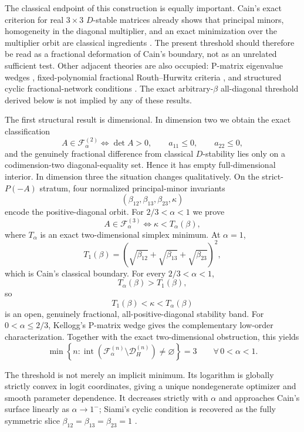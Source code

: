 The classical endpoint of this construction is equally important. Cain's exact criterion for real \(3\times3\) \(D\)-stable matrices already shows that principal minors, homogeneity in the diagonal multiplier, and an exact minimization over the multiplier orbit are classical ingredients \cite{Cain1976}. The present threshold should therefore be read as a fractional deformation of Cain's boundary, not as an unrelated sufficient test. Other adjacent theories are also occupied: P-matrix eigenvalue wedges \cite{Kellogg1972}, fixed-polynomial fractional Routh--Hurwitz criteria \cite{CermakNechvatal2017,BourafaAbdelouahabMoussaoui2020}, and structured cyclic fractional-network conditions \cite{Siami2021}. The exact arbitrary-\(\beta\) all-diagonal threshold derived below is not implied by any of these results.

The first structural result is dimensional. In dimension two we obtain the exact classification
\[
 A\in\mathcal F_\alpha^{(2)}
 \iff
 \det A>0,\qquad a_{11}\le0,\qquad a_{22}\le0,
\]
and the genuinely fractional difference from classical \(D\)-stability lies only on a codimension-two diagonal-equality set. Hence it has empty full-dimensional interior. In dimension three the situation changes qualitatively. On the strict-\(P(-A)\) stratum, four normalized principal-minor invariants
\[
 (\beta_{12},\beta_{13},\beta_{23},\kappa)
\]
encode the positive-diagonal orbit. For \(2/3<\alpha<1\) we prove
\[
 A\in\mathcal F_\alpha^{(3)}
 \iff
 \kappa<T_\alpha(\beta),
\]
where \(T_\alpha\) is an exact two-dimensional simplex minimum. At \(\alpha=1\),
\[
 T_1(\beta)
 =
 \left(
 \sqrt{\beta_{12}}+
 \sqrt{\beta_{13}}+
 \sqrt{\beta_{23}}
 \right)^2,
\]
which is Cain's classical boundary. For every \(2/3<\alpha<1\),
\[
 T_\alpha(\beta)>T_1(\beta),
\]
so
\[
 T_1(\beta)<\kappa<T_\alpha(\beta)
\]
is an open, genuinely fractional, all-positive-diagonal stability band. For \(0<\alpha\le2/3\), Kellogg's P-matrix wedge gives the complementary low-order characterization. Together with the exact two-dimensional obstruction, this yields
\[
 \min\left\{
 n:
 \operatorname{int}
 \left(
 \mathcal F_\alpha^{(n)}
 \setminus
 \mathcal D_H^{(n)}
 \right)
 \ne\varnothing
 \right\}=3
 \qquad
 \forall\,0<\alpha<1.
\]

The threshold is not merely an implicit minimum. Its logarithm is globally strictly convex in logit coordinates, giving a unique nondegenerate optimizer and smooth parameter dependence. It decreases strictly with \(\alpha\) and approaches Cain's surface linearly as \(\alpha\to1^{-}\); Siami's cyclic condition is recovered as the fully symmetric slice \(\beta_{12}=\beta_{13}=\beta_{23}=1\) \cite{Siami2021}.

